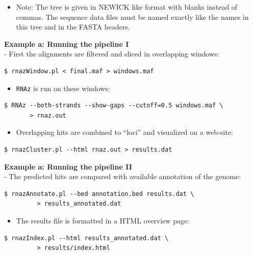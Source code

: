 \documentclass[]{article}
\providecommand{\tightlist}{%
  \setlength{\itemsep}{0pt}\setlength{\parskip}{0pt}}
\begin{document}
\begin{itemize}
\tightlist
\item
  Note: The tree is given in NEWICK like format with blanks instead of
  commas. The sequence data files must be named exactly like the names in
  this tree and in the FASTA headers.
\end{itemize}

\textbf{Example a: Running the pipeline I}\\
- First the alignments are filtered and sliced in overlapping windows:

\begin{verbatim}
$ rnazWindow.pl < final.maf > windows.maf
\end{verbatim}

\begin{itemize}
\tightlist
\item
  \texttt{RNAz} is run on these windows:
\end{itemize}

\begin{verbatim}
$ RNAz --both-strands --show-gaps --cutoff=0.5 windows.maf \
       > rnaz.out
\end{verbatim}

\begin{itemize}
\tightlist
\item
  Overlapping hits are combined to ``loci'' and visualized on a
  web-site:
\end{itemize}

\begin{verbatim}
$ rnazCluster.pl --html rnaz.out > results.dat
\end{verbatim}

\textbf{Example a: Running the pipeline II}\\
- The predicted hits are compared with available annotation of the
genome:

\begin{verbatim}
$ rnazAnnotate.pl --bed annotation.bed results.dat \
         > results_annotated.dat
\end{verbatim}

\begin{itemize}
\tightlist
\item
  The results file is formatted in a HTML overview page:
\end{itemize}

\begin{verbatim}
$ rnazIndex.pl --html results_annotated.dat \
         > results/index.html
\end{verbatim}
\end{document}
